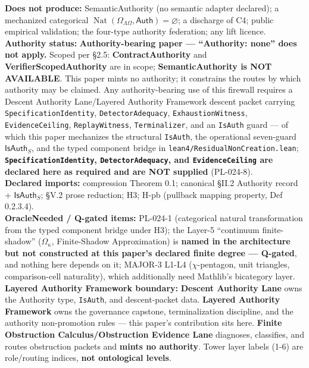 \documentclass[
  10pt,
]{article}
\DeclareRobustCommand{\texttt}[1]{{\paperSymbolFont\nolinkurl{#1}}}
\begin{document}
\textbf{Does not produce:} SemanticAuthority (no semantic adapter declared); a mechanized categorical \protect\hypertarget{math-E0103-0167}{}{\(\operatorname{Nat}(\Omega_{\Lambda\Omega},\mathsf{Auth}) = \varnothing\)}; a discharge of C4; public empirical validation; the four-type authority federation; any lift licence.\\
\textbf{Authority status:} \textbf{Authority-bearing paper --- ``Authority: none'' does not apply.} Scoped per §2.5: \textbf{ContractAuthority} and \textbf{VerifierScopedAuthority} are in scope; \textbf{SemanticAuthority is NOT AVAILABLE}. This paper mints no authority; it constrains the routes by which authority may be claimed. Any authority-bearing use of this firewall requires a Descent Authority Lane/Layered Authority Framework descent packet carrying \texttt{SpecificationIdentity}, \texttt{DetectorAdequacy}, \texttt{ExhaustionWitness}, \texttt{EvidenceCeiling}, \texttt{ReplayWitness}, \texttt{Terminalizer}, and an \texttt{IsAuth} guard --- of which this paper mechanizes the structural \texttt{IsAuth}, the operational seven-guard \protect\hypertarget{math-E0033-0168}{}{\(\mathsf{IsAuth}_S\)}, and the typed component bridge in \texttt{lean4/ResidualNonCreation.lean}; \textbf{\texttt{SpecificationIdentity}, \texttt{DetectorAdequacy}, and \texttt{EvidenceCeiling} are declared here as required and are NOT supplied} (PL-024-8).\\
\textbf{Declared imports:} compression Theorem 0.1; canonical §II.2 Authority record + \protect\hypertarget{math-E0033-0169}{}{\(\mathsf{IsAuth}_S\)}; §V.2 prose reduction; H3; H-pb (pullback mapping property, Def 0.2.3.4).\\
\textbf{OracleNeeded / Q-gated items:} PL-024-1 (categorical natural transformation from the typed component bridge under H3); the Layer-5 ``continuum finite-shadow'' (\protect\hypertarget{math-E0028-0170}{}{\(\Omega_\kappa\)}, Finite-Shadow Approximation) is \textbf{named in the architecture but not constructed at this paper's declared finite degree --- Q-gated}, and nothing here depends on it; MAJOR-3 L1-L4 (\protect\hypertarget{math-E0081-0171}{}{\(\chi\)}-pentagon, unit triangles, comparison-cell naturality), which additionally need Mathlib's bicategory layer.\\
\textbf{Layered Authority Framework boundary:} \textbf{Descent Authority Lane} owns the Authority type, \texttt{IsAuth}, and descent-packet data. \textbf{Layered Authority Framework} owns the governance capstone, terminalization discipline, and the authority non-promotion rules --- this paper's contribution sits here. \textbf{Finite Obstruction Calculus/Obstruction Evidence Lane} diagnoses, classifies, and routes obstruction packets and \textbf{mints no authority}. Tower layer labels (1-6) are role/routing indices, \textbf{not ontological levels}.\\
\end{document}
